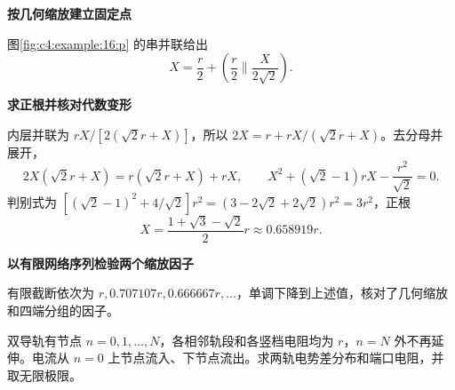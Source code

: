 \begin{solution}
\par\medskip{}\noindent\textbf{按几何缩放建立固定点}\par\nobreak
图\ref{fig:c4:example:16:p} 的串并联给出
\[
 X=\frac r2+\left(\frac r2\parallel\frac{X}{2\sqrt2}\right).
\]


\par\medskip{}\noindent\textbf{求正根并核对代数变形}\par\nobreak
内层并联为 $rX/[2(\sqrt2r+X)]$，所以 $2X=r+rX/(\sqrt2r+X)$。去分母并展开，
\[
 2X(\sqrt2r+X)=r(\sqrt2r+X)+rX,
 \qquad X^2+(\sqrt2-1)rX-\frac{r^2}{\sqrt2}=0.
\]
判别式为 $[(\sqrt2-1)^2+4/\sqrt2]r^2=(3-2\sqrt2+2\sqrt2)r^2=3r^2$，正根
\[
 X=\frac{1+\sqrt3-\sqrt2}{2}r\approx0.658919r.
\]


\par\medskip{}\noindent\textbf{以有限网络序列检验两个缩放因子}\par\nobreak
有限截断依次为 $r,0.707107r,0.666667r,\ldots$，单调下降到上述值，核对了几何缩放和四端分组的因子。\end{solution}
\begin{question}\begin{example}[有限双导轨的端口电阻]\label{c4:example:17}
双导轨有节点 $n=0,1,\ldots,N$，各相邻轨段和各竖档电阻均为 $r$，$n=N$ 外不再延伸。电流从 $n=0$ 上节点流入、下节点流出。求两轨电势差分布和端口电阻，并取无限极限。
\end{example}
\end{question}
